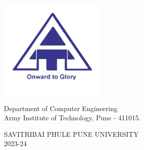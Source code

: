 \begin{center}
	\includegraphics[scale=0.75]{components/images/logo.png} \\[0.5cm]
	
	Department of Computer Engineering \\
	Army Institute of Technology, Pune - 411015.\\
	\vspace*{0.5\baselineskip}

	SAVITRIBAI PHULE PUNE UNIVERSITY \\
	2023-24
\end{center}

\pagebreak